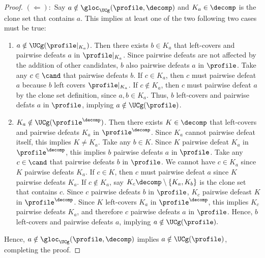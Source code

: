 \begin{proof}
    \noindent $(\Leftarrow):$ Say $a \notin \gloc_{\UCg}(\profile, \decomp)$ and $K_a \in \decomp$ is the clone set that contains $a$. This implies at least one of the two following two cases must be true:
    \begin{enumerate}
        \item $a \notin \UCg(\profile|_{K_a})$. Then there exists $b \in K_a$ that left-covers and pairwise defeats $a$ in $\profile|_{K_a}$. Since pairwise defeats are not affected by the addition of other candidates, $b$ also pairwise defeats $a$ in $\profile$. Take any $c \in \cand$ that pairwise defeats $b$. If $c \in K_a$, then $c$ must pairwise defeat $a$ because $b$ left covers $\profile|_{K_a}$. If $c \notin K_a$, then $c$ must pairwise defeat $a$ by the clone set definition, since $a,b \in K_a$. Thus, $b$ left-covers and pairwise defats $a$ in $\profile$, implying $a \notin \UCg(\profile)$.
        \item $K_a \notin \UCg(\profile^\decomp)$. Then there exists $K \in \decomp$ that left-covers and pairwise defeats $K_a$ in $\profile^\decomp$. Since $K_a$ cannot pairwise defeat itself, this implies $K \neq K_a$. Take any $b \in K$. Since $K$ pairwise defeat $K_a$ in $\profile^\decomp$, this implies $b$ pairwise defeats $a$ in $\profile$. Take any $c \in \cand$ that pairwise defeats $b$ in $\profile$. We cannot have $c \in K_a$ since $K$ pairwise defeats $K_a$. If $c \in K$, then $c$ must pairwise defeat $a$ since $K$ pairwise defeats $K_a$. If $c \notin K_a$, say $K_c \decomp \setminus \{K_a, K_b\}$ is the clone set that contains $c$. Since $c$ pairwise defeats $b$ in $\profile$, $K_c$ pairwise defeast $K$ in $\profile^\decomp$. Since $K$ left-covers $K_a$ in $\profile^\decomp$, this implies $K_c$ pairwise defeats $K_a$, and therefore $c$ pairwise defeats $a$ in $\profile$. Hence, $b$ left-covers and pairwise defeats $a$, implying $a\notin \UCg(\profile).$
    \end{enumerate}
    Hence, $a \notin \gloc_{\UCg}(\profile, \decomp)$ implies $a \notin \UCg(\profile)$, completing the proof.
\end{proof}